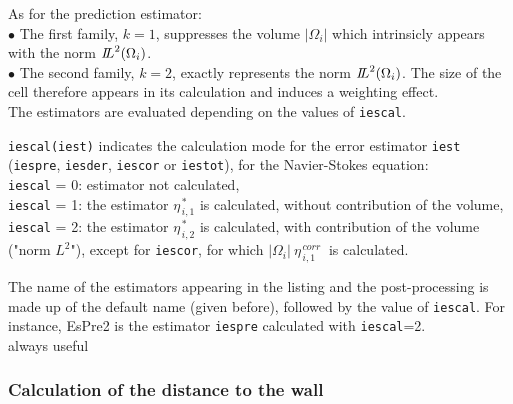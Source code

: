 As for the prediction estimator:\\
\hspace*{0.5cm}$\bullet$ The first family, $k=1$, suppresses the
volume $|\Omega_i|$ which intrinsicly appears  with the norm
${{I\hspace{-.25em}L}^{2}(\Omega_i)}$.\\
\hspace*{0.5cm}$\bullet$ The second family, $k=2$, exactly represents the norm
${{I\hspace{-.25em}L}^{2}(\Omega_i)}$. The size of the cell therefore
appears in its calculation and induces a weighting effect.\\


The estimators are evaluated depending on the values of {\tt iescal}.


{{\tt iescal(iest)} indicates the calculation mode
for the error estimator {\tt iest} ({\tt iespre}, {\tt iesder}, {\tt iescor} or
{\tt iestot}), for
the Navier-Stokes equation:\\
 {\tt iescal} = 0: estimator not calculated, \\
 {\tt iescal} = 1: the estimator $ \eta^{\,* }_{\,i,1}$ is calculated,
                   without contribution of the volume, \\
 {\tt iescal} = 2: the estimator $ \eta^{\,* }_{\,i,2}$ is calculated,
                   with contribution of the volume ("norm $L^2$"),
                   except for {\tt iescor}, for which
                   $|\Omega_i|\ \eta^{\,corr}_{\,i,1}\ $
                   is calculated.

The name of the estimators appearing in the listing and the post-processing is
made up of the default name (given before), followed by the value of
{\tt iescal}. For
instance, EsPre2 is the estimator {\tt iespre} calculated with {\tt iescal}=2.\\
always useful}



\subsubsection{Calculation of the distance to the wall}

